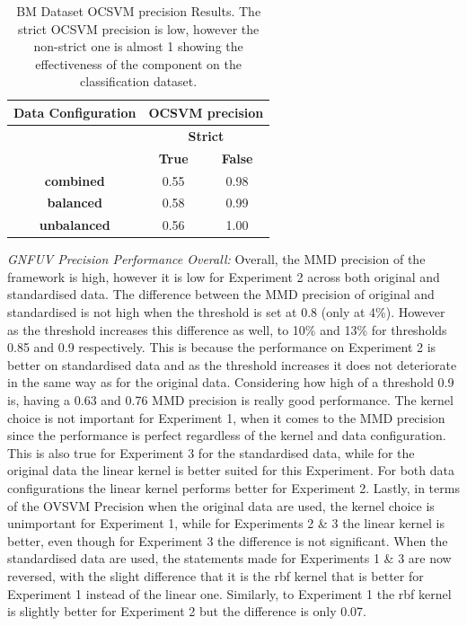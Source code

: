 \documentclass{mpaper}
\begin{document}
\begin{table}[]
\centering
\begin{tabular}{|c|cc|}
\hline
\textbf{Data Configuration} & \multicolumn{2}{c|}{\textbf{OCSVM precision}} \\ \hline
\textbf{}                     & \multicolumn{2}{c|}{\textbf{Strict}}          \\ \cline{2-3} 
\textbf{}                     & \textbf{True}         & \textbf{False}        \\ \hline
\textbf{combined}             & 0.55                  & 0.98                  \\
\textbf{balanced}             & 0.58                  & 0.99                  \\
\textbf{unbalanced}           & 0.56                  & 1.00                  \\ \hline
\end{tabular}
\caption{\label{tab:bm_ocsvm_precision}BM Dataset OCSVM precision Results. The strict OCSVM precision is low, however the non-strict one is almost 1 showing the effectiveness of the component on the classification dataset.}
\end{table}

\textit{GNFUV Precision Performance Overall:} {} Overall, the MMD precision of the framework is high, however it is low for Experiment 2 across both original and standardised data. The difference between the MMD precision of original and standardised is not high when the threshold is set at 0.8 (only at 4\%). However as the threshold increases this difference as well, to 10\% and 13\% for thresholds 0.85 and 0.9 respectively. This is because the performance on Experiment 2 is better on standardised data and as the threshold increases it does not deteriorate in the same way as for the original data. Considering how high of a threshold 0.9 is, having a 0.63 and 0.76 MMD precision is really good performance. The kernel choice is not important for Experiment 1, when it comes to the MMD precision since the performance is perfect regardless of the kernel and data configuration. This is also true for Experiment 3 for the standardised data, while for the original data the linear kernel is better suited for this Experiment. For both data configurations the linear kernel performs better for Experiment 2. Lastly, in terms of the OVSVM Precision when the original data are used, the kernel choice is unimportant for Experiment 1, while for Experiments 2 \& 3 the linear kernel is better, even though for Experiment 3 the difference is not significant. When the standardised data are used, the statements made for Experiments 1 \& 3 are now reversed, with the slight difference that it is the rbf kernel that is better for Experiment 1 instead of the linear one. Similarly, to Experiment 1 the rbf kernel is slightly better for Experiment 2 but the difference is only 0.07.
\end{document}
